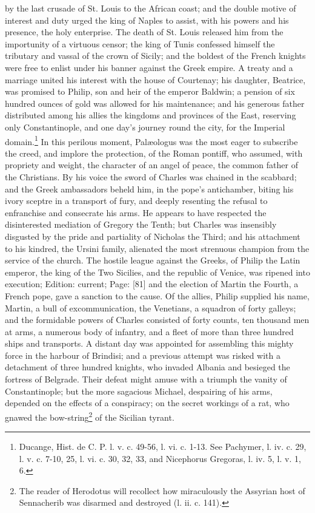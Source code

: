 by the last crusade of St. Louis to the African coast; and the double motive of interest and duty urged the king of Naples to assist, with his powers and his presence, the holy enterprise. The death of St. Louis released him from the importunity of a virtuous censor; the king of Tunis confessed himself the tributary and vassal of the crown of Sicily; and the boldest of the French knights were free to enlist under his banner against the Greek empire. A treaty and a marriage united his interest with the house of Courtenay; his daughter, Beatrice, was promised to Philip, son and heir of the emperor Baldwin; a pension of six hundred ounces of gold was allowed for his maintenance; and his generous father distributed among his allies the kingdoms and provinces of the East, reserving only Constantinople, and one day\texthebrew{}’s journey round the city, for the Imperial domain.\footnote{Ducange, Hist. de C. P. l. v. c. 49-56, l. vi. c. 1-13. See Pachymer, l. iv. c. 29, l. v. c. 7-10, 25, l. vi. c. 30, 32, 33, and Nicephorus Gregoras, l. iv. 5, l. v. 1, 6.} In this perilous moment, Palæologus was the most eager to subscribe the creed, and implore the protection, of the Roman pontiff, who assumed, with propriety and weight, the character of an angel of peace, the common father of the Christians. By his voice the sword of Charles was chained in the scabbard; and the Greek ambassadors beheld him, in the pope\texthebrew{}’s antichamber, biting his ivory sceptre in a transport of fury, and deeply resenting the refusal to enfranchise and consecrate his arms. He appears to have respected the disinterested mediation of Gregory the Tenth; but Charles was insensibly disgusted by the pride and partiality of Nicholas the Third; and his attachment to his kindred, the Ursini family, alienated the most strenuous champion from the service of the church. The hostile league against the Greeks, of Philip the Latin emperor, the king of the Two Sicilies, and the republic of Venice, was ripened into execution; Edition: current; Page: [81] and the election of Martin the Fourth, a French pope, gave a sanction to the cause. Of the allies, Philip supplied his name, Martin, a bull of excommunication, the Venetians, a squadron of forty galleys; and the formidable powers of Charles consisted of forty counts, ten thousand men at arms, a numerous body of infantry, and a fleet of more than three hundred ships and transports. A distant day was appointed for assembling this mighty force in the harbour of Brindisi; and a previous attempt was risked with a detachment of three hundred knights, who invaded Albania and besieged the fortress of Belgrade. Their defeat might amuse with a triumph the vanity of Constantinople; but the more sagacious Michael, despairing of his arms, depended on the effects of a conspiracy; on the secret workings of a rat, who gnawed the bow-string\footnote{The reader of Herodotus will recollect how miraculously the Assyrian host of Sennacherib was disarmed and destroyed (l. ii. c. 141).} of the Sicilian tyrant.

